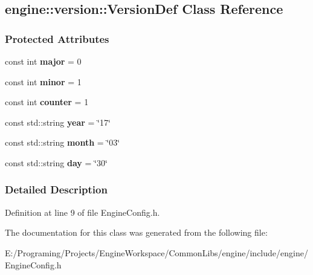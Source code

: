 \hypertarget{a00080}{}\subsection{engine\+:\+:version\+:\+:Version\+Def Class Reference}
\label{a00080}
\subsubsection*{Protected Attributes}
\begin{DoxyCompactItemize}
\item 
const int {\bfseries major} = 0\hypertarget{a00080_a0b9a44d65bbc763dcd74daf581572fe2}{}\label{a00080_a0b9a44d65bbc763dcd74daf581572fe2}

\item 
const int {\bfseries minor} = 1\hypertarget{a00080_a677bfac625f58b5804d70f14861eb26e}{}\label{a00080_a677bfac625f58b5804d70f14861eb26e}

\item 
const int {\bfseries counter} = 1\hypertarget{a00080_aba60198eae9769727969c909073c7a7d}{}\label{a00080_aba60198eae9769727969c909073c7a7d}

\item 
const std\+::string {\bfseries year} = \char`\"{}17\char`\"{}\hypertarget{a00080_aa546ca8748276eccf7ab3b616eb8bed3}{}\label{a00080_aa546ca8748276eccf7ab3b616eb8bed3}

\item 
const std\+::string {\bfseries month} = \char`\"{}03\char`\"{}\hypertarget{a00080_aeea4822a81d2dd44c4d23c224f6504c6}{}\label{a00080_aeea4822a81d2dd44c4d23c224f6504c6}

\item 
const std\+::string {\bfseries day} = \char`\"{}30\char`\"{}\hypertarget{a00080_a141d3e9a073994719672fc21cb251627}{}\label{a00080_a141d3e9a073994719672fc21cb251627}

\end{DoxyCompactItemize}


\subsubsection{Detailed Description}


Definition at line 9 of file Engine\+Config.\+h.



The documentation for this class was generated from the following file\+:\begin{DoxyCompactItemize}
\item 
E\+:/\+Programing/\+Projects/\+Engine\+Workspace/\+Common\+Libs/engine/include/engine/Engine\+Config.\+h\end{DoxyCompactItemize}

